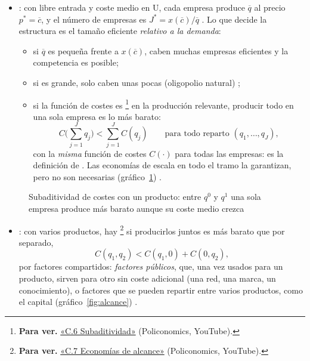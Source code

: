 \documentclass[11pt]{article}
\begin{document}
\begin{itemize}
\item {}: con libre entrada y coste medio en U, cada empresa produce $\overline{q}$ al precio $p^{*}=\overline{c}$, y el número de empresas es $J^{*}=x(\overline{c})/\overline{q}$ . Lo que decide la estructura es el tamaño eficiente \emph{relativo a la demanda}:
  \begin{itemize}
  \item si $\overline{q}$ es pequeña frente a $x(\overline{c})$, caben muchas empresas eficientes y la competencia es posible;
  \item si es grande, solo caben unas pocas (oligopolio natural) ;
  \item si la función de costes es \footnote{\textbf{Para ver.} \href{https://www.youtube.com/watch?v=zguAhXFX6QM}{«C.6 Subaditividad»} (Policonomics, YouTube).} en la producción relevante, producir todo en una sola empresa es lo más barato:
  \begin{equation}\label{eq:subaditividad}
  C\Big(\sum_{j=1}^{J}q_j\Big)<\sum_{j=1}^{J}C(q_j)\qquad\text{para todo reparto } (q_1,\dots,q_J),
  \end{equation}
  con la \emph{misma} función de costes $C(\cdot)$ para todas las empresas: es la definición de \nocite{Baumol1977Proper}. Las economías de escala en todo el tramo la garantizan, pero no son necesarias (gráfico~\ref{fig:subaditividad}) .
  \end{itemize}
\end{itemize}

\begin{figure}[H]
\centering
\caption{Subaditividad de costes con un producto: entre $q^0$ y $q^1$ una sola empresa produce más barato aunque su coste medio crezca}\label{fig:subaditividad}
\end{figure}

\begin{itemize}
\item {}: con varios productos, hay \footnote{\textbf{Para ver.} \href{https://www.youtube.com/watch?v=C3aW04WuLfE}{«C.7 Economías de alcance»} (Policonomics, YouTube).} si producirlos juntos es más barato que por separado,
  \[
  C(q_1,q_2)<C(q_1,0)+C(0,q_2),
  \]
  por factores compartidos: \emph{factores públicos}, que, una vez usados para un producto, sirven para otro sin coste adicional (una red, una marca, un conocimiento), o factores que se pueden repartir entre varios productos, como el capital (gráfico~\ref{fig:alcance})\nocite{PanzarWillig1981Economies} .
\end{itemize}
\end{document}
